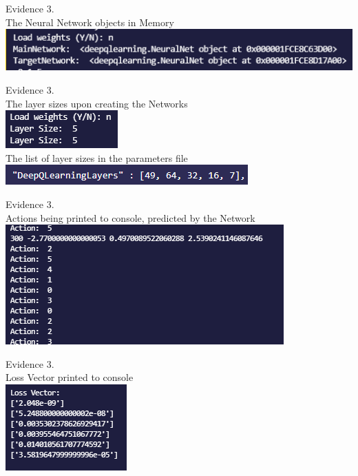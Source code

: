 \setcounter{magicrownumbers}{0}
\begin{center}
    {\large Evidence 3.\rn } \\ 
    \vspace{0.3cm}
    The Neural Network objects in Memory
    \includegraphics{Images/Testing/T3.1.1.PNG}
    \vspace{1cm}
    
    {\large Evidence 3.\rn } \\ 
    \vspace{0.3cm}
    The layer sizes upon creating the Networks \\
    \includegraphics{Images/Testing/T3.2.1.PNG} \\
    The list of layer sizes in the parameters file \\
    \includegraphics{Images/Testing/T3.2.2.PNG}
    \vspace{1cm}

    {\large Evidence 3.\rn } \\ 
    \vspace{0.3cm}
    Actions being printed to console, predicted by the Network \\
    \includegraphics{Images/Testing/T3.3.1.PNG}
    \vspace{1cm}

    {\large Evidence 3.\rn } \\ 
    \vspace{0.3cm}
    Loss Vector printed to console \\
    \includegraphics{Images/Testing/T3.9.2.PNG}
    \vspace{1cm}


\end{center}

